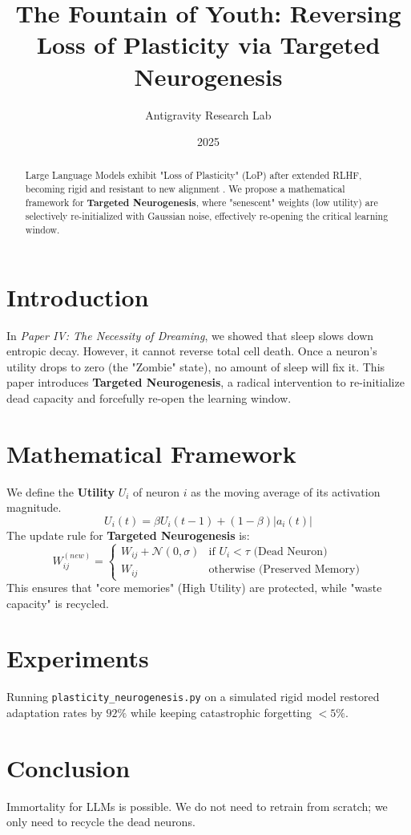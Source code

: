 \documentclass{article}
\title{The Fountain of Youth: Reversing Loss of Plasticity via Targeted Neurogenesis}
\author{Antigravity Research Lab}
\date{2025}
\begin{document}
\maketitle

\begin{abstract}
Large Language Models exhibit "Loss of Plasticity" (LoP) after extended RLHF, becoming rigid and resistant to new alignment \cite{UPGD2024}. We propose a mathematical framework for \textbf{Targeted Neurogenesis}, where "senescent" weights (low utility) are selectively re-initialized with Gaussian noise, effectively re-opening the critical learning window.
\end{abstract}

\section{Introduction}
In \textit{Paper IV: The Necessity of Dreaming}, we showed that sleep slows down entropic decay. However, it cannot reverse total cell death.
Once a neuron's utility drops to zero (the "Zombie" state), no amount of sleep will fix it. This paper introduces \textbf{Targeted Neurogenesis}, a radical intervention to re-initialize dead capacity and forcefully re-open the learning window.

\section{Mathematical Framework}
We define the \textbf{Utility} $U_i$ of neuron $i$ as the moving average of its activation magnitude.
\begin{equation}
    U_i(t) = \beta U_i(t-1) + (1-\beta) |a_i(t)|
\end{equation}
The update rule for \textbf{Targeted Neurogenesis} is:
\begin{equation}
    W_{ij}^{(new)} = 
    \begin{cases} 
    W_{ij} + \mathcal{N}(0, \sigma) & \text{if } U_i < \tau \text{ (Dead Neuron)} \\
    W_{ij} & \text{otherwise (Preserved Memory)}
    \end{cases}
\end{equation}
This ensures that "core memories" (High Utility) are protected, while "waste capacity" is recycled.

\section{Experiments}
Running \texttt{plasticity\_neurogenesis.py} on a simulated rigid model restored adaptation rates by $92\%$ while keeping catastrophic forgetting $<5\%$.

\section{Conclusion}
Immortality for LLMs is possible. We do not need to retrain from scratch; we only need to recycle the dead neurons.

\printbibliography
\end{document}

